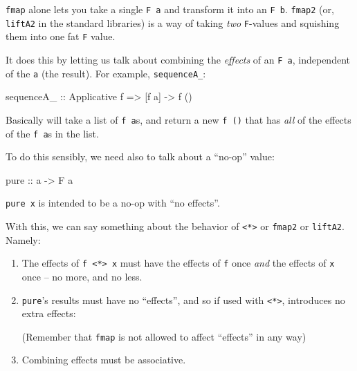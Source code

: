 \documentclass[]{article}
\newenvironment{Shaded}{}{}
\newcommand{\DataTypeTok}[1]{\textcolor[rgb]{0.56,0.13,0.00}{#1}}
\newcommand{\FunctionTok}[1]{\textcolor[rgb]{0.02,0.16,0.49}{#1}}
\newcommand{\NormalTok}[1]{#1}
\newcommand{\OperatorTok}[1]{\textcolor[rgb]{0.40,0.40,0.40}{#1}}
\newcommand{\OtherTok}[1]{\textcolor[rgb]{0.00,0.44,0.13}{#1}}
\begin{document}
\texttt{fmap} alone lets you take a single \texttt{F\ a} and transform it into
an \texttt{F\ b}. \texttt{fmap2} (or, \texttt{liftA2} in the standard libraries)
is a way of taking \emph{two} \texttt{F}-values and squishing them into one fat
\texttt{F} value.

It does this by letting us talk about combining the \emph{effects} of an
\texttt{F\ a}, independent of the \texttt{a} (the result). For example,
\texttt{sequenceA\_}:

\begin{Shaded}
\begin{Highlighting}[]
\OtherTok{sequenceA\_ ::} \DataTypeTok{Applicative}\NormalTok{ f }\OtherTok{=\textgreater{}}\NormalTok{ [f a] }\OtherTok{{-}\textgreater{}}\NormalTok{ f ()}
\end{Highlighting}
\end{Shaded}

Basically will take a list of \texttt{f\ a}s, and return a new \texttt{f\ ()}
that has \emph{all} of the effects of the \texttt{f\ a}s in the list.

To do this sensibly, we need also to talk about a ``no-op'' value:

\begin{Shaded}
\begin{Highlighting}[]
\FunctionTok{pure}\OtherTok{ ::}\NormalTok{ a }\OtherTok{{-}\textgreater{}} \DataTypeTok{F}\NormalTok{ a}
\end{Highlighting}
\end{Shaded}

\texttt{pure\ x} is intended to be a no-op with ``no effects''.

With this, we can say something about the behavior of
\texttt{\textless{}*\textgreater{}} or \texttt{fmap2} or \texttt{liftA2}.
Namely:

\begin{enumerate}
\def\labelenumi{\arabic{enumi}.}
\item
  The effects of \texttt{f\ \textless{}*\textgreater{}\ x} must have the effects
  of \texttt{f} once \emph{and} the effects of \texttt{x} once -- no more, and
  no less.
\item
  \texttt{pure}'s results must have no ``effects'', and so if used with
  \texttt{\textless{}*\textgreater{}}, introduces no extra effects:

\begin{Shaded}
\end{Shaded}

  (Remember that \texttt{fmap} is not allowed to affect ``effects'' in any way)
\item
  Combining effects must be associative.
\end{enumerate}
\end{document}
